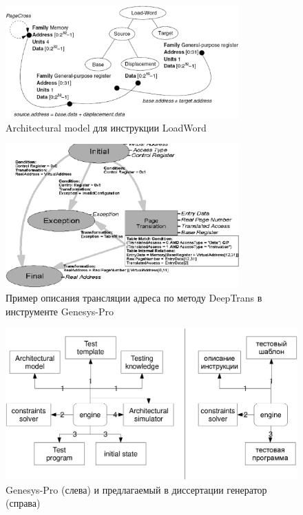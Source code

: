\begin{figure}[h] \center
  \includegraphics[width=0.8\textwidth]{4.analysis/arch-model}
  \caption{Architectural model для инструкции
LoadWord}\label{fig:GenesysProArchitecturalModel}
\end{figure}

\begin{figure}[h] \center
  \includegraphics[width=0.8\textwidth]{4.analysis/deeptrans}
  \caption{Пример описания трансляции адреса по методу DeepTrans в инструменте Genesys-Pro}\label{fig:DeepTransExample}
\end{figure}

\begin{figure}[h] \center
  \includegraphics[width=\textwidth]{4.analysis/g-pro}
  \caption{Genesys-Pro (слева) и предлагаемый в диссертации генератор (справа)}\label{fig:GenesysProScheme}
\end{figure}

